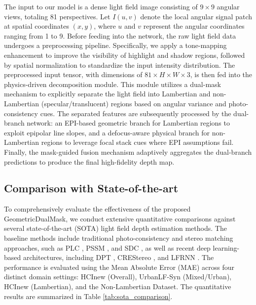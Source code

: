 \documentclass[lettersize,journal]{IEEEtran}
\begin{document}
The input to our model is a dense light field image consisting of $9 \times 9$ angular views, totaling 81 perspectives. Let $I(u,v)$ denote the local angular signal patch at spatial coordinates $(x,y)$, where $u$ and $v$ represent the angular coordinates ranging from 1 to 9. Before feeding into the network, the raw light field data undergoes a preprocessing pipeline. Specifically, we apply a tone-mapping enhancement to improve the visibility of highlight and shadow regions, followed by spatial normalization to standardize the input intensity distribution. The preprocessed input tensor, with dimensions of $81 \times H \times W \times 3$, is then fed into the physics-driven decomposition module. This module utilizes a dual-mask mechanism to explicitly separate the light field into Lambertian and non-Lambertian (specular/translucent) regions based on angular variance and photo-consistency cues. The separated features are subsequently processed by the dual-branch network: an EPI-based geometric branch for Lambertian regions to exploit epipolar line slopes, and a defocus-aware physical branch for non-Lambertian regions to leverage focal stack cues where EPI assumptions fail. Finally, the mask-guided fusion mechanism adaptively aggregates the dual-branch predictions to produce the final high-fidelity depth map.


\subsection{Comparison with State-of-the-art}

To comprehensively evaluate the effectiveness of the proposed GeometricDualMask, we conduct extensive quantitative comparisons against several state-of-the-art (SOTA) light field depth estimation methods. The baseline methods include traditional photo-consistency and stereo matching approaches, such as PLC \cite{plc}, PSSM \cite{pssm}, and SDC \cite{sdc}, as well as recent deep learning-based architectures, including DPT \cite{dpt}, CREStereo \cite{crestereo}, and LFRNN \cite{lfrnn}. The performance is evaluated using the Mean Absolute Error (MAE) across four distinct domain settings: HCInew (Overall), UrbanLF-Syn (Mixed/Urban), HCInew (Lambertian), and the Non-Lambertian Dataset. The quantitative results are summarized in Table \ref{tab:sota_comparison}.
\end{document}
